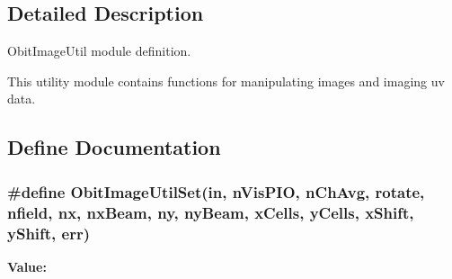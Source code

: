 \subsection{Detailed Description}
Obit\-Image\-Util module definition. 

This utility module contains functions for manipulating images and imaging uv data.

\subsection{Define Documentation}
\subsubsection{\setlength{\rightskip}{0pt plus 5cm}\#define Obit\-Image\-Util\-Set(in, n\-Vis\-PIO, n\-Ch\-Avg, rotate, nfield, nx, nx\-Beam, ny, ny\-Beam, x\-Cells, y\-Cells, x\-Shift, y\-Shift, err)}\label{ObitImageUtil_8h_a0}


{\bf Value:}

